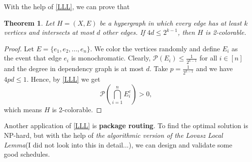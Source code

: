 \documentclass[12pt]{article}
\newtheorem{theorem}{Theorem}
\newcommand\pp{\mathcal{P}}
\newcommand\pr[1]{\mathcal{P} \left( #1\right)}
\begin{document}
With the help of \cref{LLL}, we can prove that 
\begin{theorem}
    Let $H = (X,E)$ be a hypergraph in which every 
    edge has at least $k$ vertices and 
    intersects at most $d$ other edges.
    If $4d \leq 2^{k - 1}$, then $H$ is 2-colorable.
\end{theorem}
\begin{proof}
Let $E = \{e_1,e_2,\dots,e_n\}$. 
We color the vertices randomly
and define $E_i$ as the event that edge $e_i$ is monochromatic.
Clearly, $\pp(E_i) \leq \frac{1}{2^{k-1}}$ for all $i \in [n]$
and the degree in dependency graph is at most $d$.
Take $p = \frac{1}{2^{k-1}}$ and we have 
$4pd \leq 1$. Hence, by \cref{LLL} we get
$$
    \pr{\bigcap_{i=1}^n E_i^c} > 0,
$$
which means $H$ is 2-colorable.
\end{proof}

Another application of \cref{LLL} is 
\textbf{package routing}.
To find the optimal solution is NP-hard, but with the help of
\textit{the algorithmic
version of the Lovasz Local Lemma}(I did not look into this in detail...),
we can design and validate some good schedules\cite{leighton1994packet}.



\end{document}
